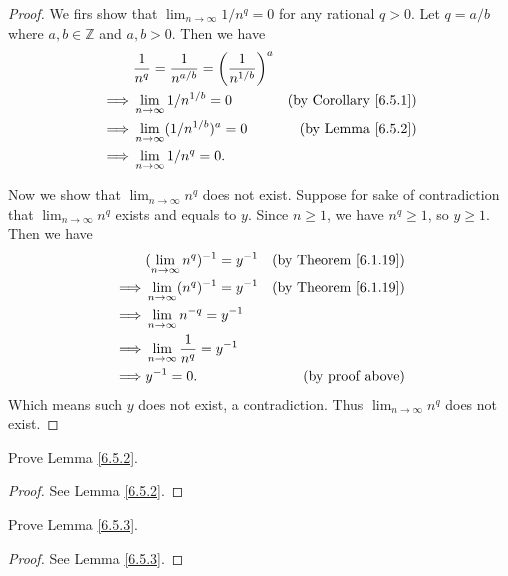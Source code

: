 \begin{proof}
We firs show that \(\lim_{n \to \infty} 1 / n^q = 0\) for any rational \(q > 0\).
Let \(q = a / b\) where \(a, b \in \mathds{Z}\) and \(a, b > 0\).
Then we have
\begin{align*}
& \frac{1}{n^q} = \frac{1}{n^{a / b}} = \bigg(\frac{1}{n^{1 / b}}\bigg)^a \\
\implies & \lim_{n \to \infty} 1 / n^{1 / b} = 0 & \text{(by Corollary \ref{6.5.1})} \\
\implies & \lim_{n \to \infty} (1 / n^{1 / b})^a = 0 & \text{(by Lemma \ref{6.5.2})} \\
\implies & \lim_{n \to \infty} 1 / n^q = 0.
\end{align*}

Now we show that \(\lim_{n \to \infty} n^q\) does not exist.
Suppose for sake of contradiction that \(\lim_{n \to \infty} n^q\) exists and equals to \(y\).
Since \(n \geq 1\), we have \(n^q \geq 1\), so \(y \geq 1\).
Then we have
\begin{align*}
& (\lim_{n \to \infty} n^q)^{-1} = y^{-1} & \text{(by Theorem \ref{6.1.19})} \\
\implies & \lim_{n \to \infty} (n^q)^{-1} = y^{-1} & \text{(by Theorem \ref{6.1.19})} \\
\implies & \lim_{n \to \infty} n^{-q} = y^{-1} \\
\implies & \lim_{n \to \infty} \frac{1}{n^q} = y^{-1} \\
\implies & y^{-1} = 0. & \text{(by proof above)}
\end{align*}
Which means such \(y\) does not exist, a contradiction.
Thus \(\lim_{n \to \infty} n^q\) does not exist.
\end{proof}

\begin{exercise}\label{ex 6.5.2}
Prove Lemma \ref{6.5.2}.
\end{exercise}

\begin{proof}
See Lemma \ref{6.5.2}.
\end{proof}

\begin{exercise}\label{ex 6.5.3}
Prove Lemma \ref{6.5.3}.
\end{exercise}

\begin{proof}
See Lemma \ref{6.5.3}.
\end{proof}